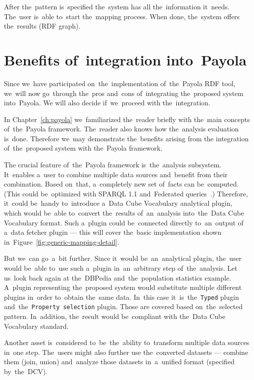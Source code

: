After the~pattern is~specified the~system has all the~information it~needs. The~user is~able to~start the~mapping process. When done, the~system offers
the~results (RDF graph).
\FloatBarrier

\section{Benefits of~integration into~Payola}
\label{why-payola}
Since we~have participated on~the~implementation of~the~Payola RDF tool, we~will 
now go~through the~pros and~cons of~integrating the~proposed system into~Payola.
We will also decide if~we~proceed with the~integration.

\begin{sloppypar}
In Chapter~\ref{ch:payola} we~familiarized the~reader briefly with the~main
concepts of~the~Payola framework. The~reader also knows how the~analysis
evaluation is~done. Therefore we~may demonstrate the~benefits arising from
the integration of~the~proposed system with the~Payola framework.
\end{sloppypar}

The crucial feature of~the~Payola framework is~the~analysis subsystem. It~enables a~user
to combine multiple data sources and~benefit from their 
combination. Based on~that, a~completely new set of~facts can be~computed.
(This could be~optimized with SPARQL 1.1 and~Federated queries~\cite{federated-queries}.) 
Therefore, it~could be~handy to~introduce a~Data Cube Vocabulary analytical 
plugin, which would be~able to~convert the~results of~an~analysis into~the~Data 
Cube Vocabulary format. Such a~plugin could be~connected directly to~an~output
of a~data fetcher plugin --- this will cover the~basic implementation shown in~Figure~\ref{fig:generic-mapping-detail}.

But we~can go~a~bit further. Since it~would be~an~analytical plugin, the~user 
would be~able to~use such a~plugin in~an~arbitrary step of~the~analysis. Let us~look back again
at the~DBPedia and~the~population statistics example. A~plugin representing the~proposed
system would substitute multiple different plugins 
in~order to~obtain the~same data. In~this case it~is~the~\texttt{Typed}
plugin and~the~\texttt{Property selection} plugin. Those are covered based on~the~selected pattern.
In~addition, the~result would be~compliant with the~Data Cube Vocabulary standard.

Another asset is~considered to~be~the~ability to~transform multiple data 
sources in~one step. The~users might also further use the~converted datasets --- combine them
(join, union) and~analyze those datasets in~a~unified format (specified by~the~DCV).


